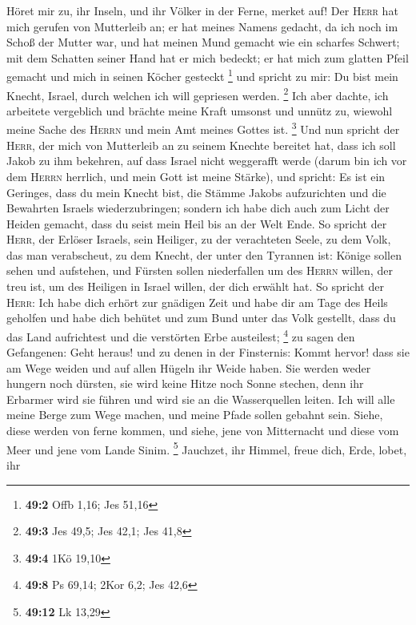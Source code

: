  Höret mir zu, ihr Inseln, und ihr Völker in der Ferne,
merket auf! Der \textsc{Herr} hat mich gerufen von Mutterleib an; er hat
meines Namens gedacht, da ich noch im Schoß der Mutter war,
 und hat meinen Mund gemacht wie ein scharfes Schwert; mit
dem Schatten seiner Hand hat er mich bedeckt; er hat mich zum glatten
Pfeil gemacht und mich in seinen Köcher gesteckt \footnote{\textbf{49:2}
  Offb 1,16; Jes 51,16}  und spricht zu mir: Du bist mein
Knecht, Israel, durch welchen ich will gepriesen werden. \footnote{\textbf{49:3}
  Jes 49,5; Jes 42,1; Jes 41,8}  Ich aber dachte, ich
arbeitete vergeblich und brächte meine Kraft umsonst und unnütz zu,
wiewohl meine Sache des \textsc{Herrn} und mein Amt meines Gottes ist.
\footnote{\textbf{49:4} 1Kö 19,10}  Und nun spricht der
\textsc{Herr}, der mich von Mutterleib an zu seinem Knechte bereitet
hat, dass ich soll Jakob zu ihm bekehren, auf dass Israel nicht
weggerafft werde (darum bin ich vor dem \textsc{Herrn} herrlich, und
mein Gott ist meine Stärke),  und spricht: Es ist ein
Geringes, dass du mein Knecht bist, die Stämme Jakobs aufzurichten und
die Bewahrten Israels wiederzubringen; sondern ich habe dich auch zum
Licht der Heiden gemacht, dass du seist mein Heil bis an der Welt Ende.
 So spricht der \textsc{Herr}, der Erlöser Israels, sein
Heiliger, zu der verachteten Seele, zu dem Volk, das man verabscheut, zu
dem Knecht, der unter den Tyrannen ist: Könige sollen sehen und
aufstehen, und Fürsten sollen niederfallen um des \textsc{Herrn} willen,
der treu ist, um des Heiligen in Israel willen, der dich erwählt hat.
 So spricht der \textsc{Herr}: Ich habe dich erhört zur
gnädigen Zeit und habe dir am Tage des Heils geholfen und habe dich
behütet und zum Bund unter das Volk gestellt, dass du das Land
aufrichtest und die verstörten Erbe austeilest; \footnote{\textbf{49:8}
  Ps 69,14; 2Kor 6,2; Jes 42,6}  zu sagen den Gefangenen:
Geht heraus! und zu denen in der Finsternis: Kommt hervor! dass sie am
Wege weiden und auf allen Hügeln ihr Weide haben.  Sie
werden weder hungern noch dürsten, sie wird keine Hitze noch Sonne
stechen, denn ihr Erbarmer wird sie führen und wird sie an die
Wasserquellen leiten.  Ich will alle meine Berge zum Wege
machen, und meine Pfade sollen gebahnt sein.  Siehe,
diese werden von ferne kommen, und siehe, jene von Mitternacht und diese
vom Meer und jene vom Lande Sinim. \footnote{\textbf{49:12} Lk 13,29}
 Jauchzet, ihr Himmel, freue dich, Erde, lobet, ihr
